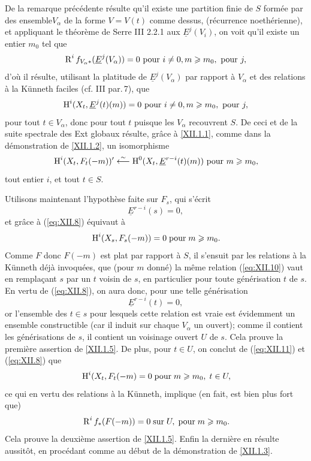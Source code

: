 De la remarque pr\'ec\'edente r\'esulte qu'il existe une partition finie de $S$ form\'ee par des ensemble$V_\alpha$ de la forme $V=V(t)$ comme dessus, (r\'ecurrence noeth\'erienne), et appliquant le th\'eor\`eme de Serre \EGA III 2.2.1 aux $\underline{E}^j(V_i)$, on voit qu'il existe un entier $m_0$ tel que
\[
\operatorname{R}^if_{V_\alpha\ast}(\underline{E}^j(V_\alpha))=0\textup{ pour } i\neq 0, m\geqslant m_0, \textup{ pour }j,
\]
d'o\`u il r\'esulte, utilisant la platitude de $\underline{E}^j(V_\alpha)$ par rapport \`a $V_\alpha$ et des relations \`a la Künneth faciles (cf. \EGA III par.\,7), que
\[
\operatorname{H}^i(X_t, \underline{E}^j(t)(m))=0\textup{ pour } i\neq 0, m\geqslant m_0, \textup{ pour }j,
\]
pour tout $t\in V_\alpha$, donc pour tout $t$ puisque les $ V_\alpha$ recouvrent $S$. De ceci et de la suite spectrale des Ext globaux r\'esulte, gr\^ace \`a \ref{XII.1.1}, comme dans la d\'emonstration de \ref{XII.1.2}, un isomorphisme
\steco
\begin{equation} \label{eq:XII.8} {}\operatorname{H}^i(X_t, F_t(-m))' \overset{\sim}{\longleftarrow} \operatorname{H}^0(X_t, \underline{E}^{r-i}(t)(m))\textup{ pour } m\geqslant m_0,
\end{equation}
tout entier $i$, et tout $t\in S$.

Utilisons maintenant l'hypoth\`ese faite sur $F_s$, qui s'\'ecrit
\steco
\begin{equation} \label{eq:XII.9} {}\underline{E}^{r-i}(s)=0,
\end{equation}
et gr\^ace \`a (\ref{eq:XII.8}) \'equivaut \`a
\steco
\begin{equation} \label{eq:XII.10} {}\operatorname{H}^i(X_s, F_s(-m))=0 \; \text{pour}\; m\geqslant m_0.
\end{equation}
Comme $F$ donc $F(-m)$ est plat par rapport \`a $S$, il s'ensuit par
les relations \`a la Künneth d\'ej\`a invoqu\'ees, que (pour $m$ donn\'e) la
m\^eme relation (\ref{eq:XII.10}) vaut en rempla\c cant $s$ par un
$t$ voisin de $s$, en particulier pour toute g\'en\'erisation $t$ de
$s$. En vertu de (\ref{eq:XII.8}), on aura donc, pour une telle
g\'en\'erisation \steco
\begin{equation} \label{eq:XII.11} {}\underline{E}^{r-i}(t)=0,
\end{equation}
or l'ensemble des $t\in s$ pour lesquels cette relation est vraie est \'evidemment un ensemble constructible (car il induit sur chaque $V_\alpha$ un ouvert); comme il contient les g\'en\'erisations de $s$, il contient un voisinage ouvert $U$ de $s$. Cela prouve la premi\`ere assertion de \ref{XII.1.5}. De plus, pour $t\in U$, on conclut de (\ref{eq:XII.11}) et (\ref{eq:XII.8}) que
\steco
\begin{equation} \label{eq:XII.12} {}\operatorname{H}^i(X_t, F_t(-m)=0 \; \text{pour}\; m\geqslant m_0, \; t\in U,
\end{equation}
ce qui en vertu des relations \`a la Künneth, implique (en fait, est bien plus fort que)
\steco
\begin{equation} \label{eq:XII.13} {}\operatorname{R}^if_\ast(F(-m))=0 \; \text{sur}\; U, \; \text{pour} \; m\geqslant m_0.
\end{equation}
Cela prouve la deuxi\`eme assertion de \ref{XII.1.5}. Enfin la derni\`ere en r\'esulte aussit\^{o}t, en proc\'edant comme au d\'ebut de la d\'emonstration de \ref{XII.1.3}.

